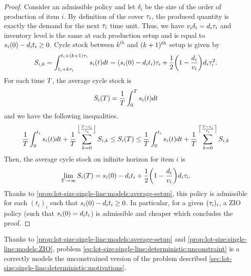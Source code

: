\begin{proof}
Consider an admissible policy and let $\delta_i$ be the size of the order of production of item $i$.
By definition of the cover $\tau_i$, the produced quantity is exactly the demand for the next $\tau_i$ time unit.
Thus, we have $v_i\delta_i=d_i\tau_i$ and inventory level is the same at each production setup and is equal to $s_i(0)-d_i t_i \ge 0$.
Cycle stock between $k^{th}$ and $\bracket{k+1}^{th}$ setup is given by
\begin{equation}
  S_{i,k}
  =
  \int_{t_i+k\cover_i}^{t_i+\bracket{k+1}\cover_i}\inventory_i(t)dt
  =
  \bracket{\inventory_i(0)-\demand_i t_i}\cover_i
  + \frac{1}{2}\bracket{1-\frac{\demand_i}{\rate_i}}\demand_i\cover_i^2.
\end{equation}
For each time $T$, the average cycle stock is
\begin{equation}
  S_i\bracket{\horizon} = \frac{1}{\horizon} \int_0^{\horizon}\inventory_i(t)dt
\end{equation}
and we have the following inequalities.
\begin{equation}
  \frac{1}{\horizon} \int_0^{t_i}\inventory_i(t)dt
  + \frac{1}{\horizon} \sum_{k=0}^{\left\lfloor\frac{\horizon-t_i}{\cover_i}\right\rfloor} S_{i,k}
  \le
  S_i\bracket{\horizon}
  \le
  \frac{1}{\horizon} \int_0^{t_i}\inventory_i(t)dt
  + \frac{1}{\horizon} \sum_{k=0}^{\left\lceil\frac{\horizon-t_i}{\cover_i}\right\rceil} S_{i,k}
\end{equation}
Then, the average cycle stock on infinite horizon for item $i$ is
\begin{equation}
  \lim_{\horizon\rightarrow\infty} S_i\bracket{\horizon}
  =
  \inventory_i(0)-\demand_i t_i
  + \frac{1}{2}\bracket{1-\frac{\demand_i}{\rate_i}}\demand_i\cover_i.
\end{equation}
Thanks to \cref{prop:lot-size:single-line:models:average-setup}, this policy is admissible for each $(t_i)_i$ such that $s_i(0)-d_i t_i\ge 0$.
In particular, for a given $\bracket{\cover_i}_i$, a ZIO policy (\ie such that $s_i(0)=d_i t_i$) is admissible and cheaper which concludes the proof.
\end{proof}


Thanks to \cref{prop:lot-size:single-line:models:average-setup} and \cref{prop:lot-size:single-line:models:ZIO}, problem \eqref{eq:lot-size:single-line:deterministic:unconstraint} is a correctly models the unconstrained version of the problem described \cref{sec:lot-size:single-line:deterministic:motivations}.


